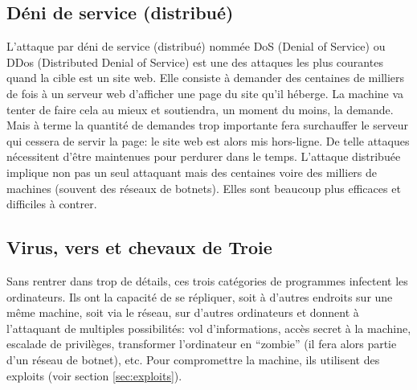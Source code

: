 \documentclass[article, french]{yReport}
\begin{document}
	\subsection{Déni de service (distribué)}
	\label{app:DoS}
	L'attaque par déni de service (distribué) nommée DoS (Denial of Service) ou DDos (Distributed Denial of Service) est une des attaques les plus courantes quand la cible est un site web.
	Elle consiste à demander des centaines de milliers de fois à un serveur web d'afficher une page du site qu'il héberge.
	La machine va tenter de faire cela au mieux et soutiendra, un moment du moins, la demande.
	Mais à terme la quantité de demandes trop importante fera surchauffer le serveur qui cessera de servir la page: le site web est alors mis hors-ligne.
	De telle attaques nécessitent d'être maintenues pour perdurer dans le temps.
	L'attaque distribuée implique non pas un seul attaquant mais des centaines voire des milliers de machines (souvent des réseaux de botnets).
	Elles sont beaucoup plus efficaces et difficiles à contrer.
	
	\subsection{Virus, vers et chevaux de Troie}
	Sans rentrer dans trop de détails, ces trois catégories de programmes infectent les ordinateurs.
	Ils ont la capacité de se répliquer, soit à d'autres endroits sur une même machine, soit via le réseau, sur d'autres ordinateurs et donnent à l'attaquant de multiples possibilités: vol d'informations, accès secret à la machine, escalade de privilèges, transformer l'ordinateur en \enquote{zombie} (il fera alors partie d'un réseau de botnet), etc.
	Pour compromettre la machine, ils utilisent des exploits (voir section \ref{sec:exploits}).
	
\end{document}
